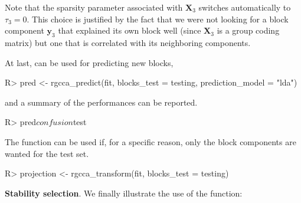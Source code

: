 \documentclass[
]{jss}
\begin{document}
\normalsize

Note that the sparsity parameter associated with \(\mathbf{X}_3\)
switches automatically to \(\tau_3 = 0\). This choice is justified by
the fact that we were not looking for a block component \(\mathbf y_3\)
that explained its own block well (since \(\mathbf{X}_3\) is a group
coding matrix) but one that is correlated with its neighboring
components.

At last,  can be used for predicting new blocks,

\footnotesize

\begin{CodeChunk}
\begin{CodeInput}
R> pred <- rgcca_predict(fit, blocks_test = testing, prediction_model = "lda")
\end{CodeInput}
\end{CodeChunk}

\normalsize

and a  summary of the performances can be reported.

\footnotesize

\begin{CodeChunk}
\begin{CodeInput}
R> pred$confusion$test
\end{CodeInput}
\end{CodeChunk}

\normalsize

The  function can be used if, for a specific
reason, only the block components are wanted for the test set.

\footnotesize

\begin{CodeChunk}
\begin{CodeInput}
R> projection <- rgcca_transform(fit, blocks_test = testing)
\end{CodeInput}
\end{CodeChunk}

\normalsize

\textbf{Stability selection}. We finally illustrate the use of the
 function:

\footnotesize

\begin{CodeChunk}
\end{CodeChunk}
\end{document}
